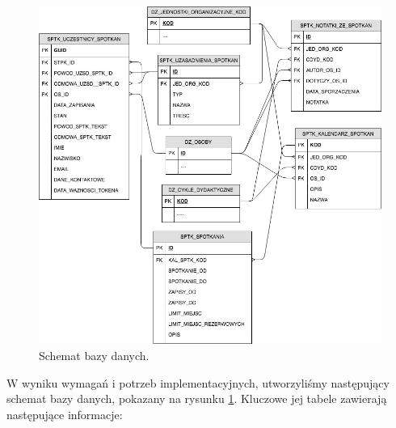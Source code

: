 \documentclass[licencjacka]{pracamgr}
\begin{document}
\begin{figure}[b!]
  \includegraphics[width=\linewidth]{schemat.jpg}
  \caption{Schemat bazy danych.}
  \label{fig:schemat}
\end{figure}

W wyniku wymagań i potrzeb implementacyjnych, utworzyliśmy następujący schemat bazy danych, pokazany na rysunku \ref{fig:schemat}. Kluczowe jej tabele zawierają następujące informacje:
\end{document}
